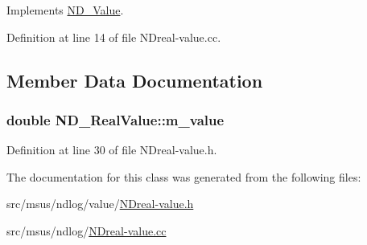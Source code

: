 Implements \hyperlink{class_n_d___value_a7660a0e6c07a198410fc05725d903219}{N\-D\-\_\-\-Value}.



Definition at line 14 of file N\-Dreal-\/value.\-cc.



\subsection{Member Data Documentation}
\hypertarget{class_n_d___real_value_a2acc7c9aaf6a18bd2b97a4c454616f2f}{
\subsubsection[{m\-\_\-value}]{\setlength{\rightskip}{0pt plus 5cm}double N\-D\-\_\-\-Real\-Value\-::m\-\_\-value\hspace{0.3cm}{\ttfamily [protected]}}}\label{class_n_d___real_value_a2acc7c9aaf6a18bd2b97a4c454616f2f}


Definition at line 30 of file N\-Dreal-\/value.\-h.



The documentation for this class was generated from the following files\-:\begin{DoxyCompactItemize}
\item 
src/msus/ndlog/value/\hyperlink{_n_dreal-value_8h}{N\-Dreal-\/value.\-h}\item 
src/msus/ndlog/\hyperlink{_n_dreal-value_8cc}{N\-Dreal-\/value.\-cc}\end{DoxyCompactItemize}
